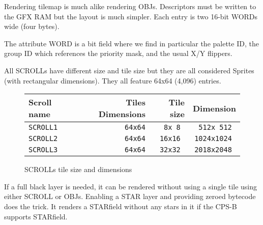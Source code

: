 Rendering tilemap is much alike rendering OBJs. Descriptors must be written to the GFX RAM but the layout is much simpler. Each entry is two 16-bit WORDs wide (four bytes).

 

The attribute WORD is a bit field where we find in particular the palette ID, the group ID which references the priority mask, and the usual X/Y flippers.

 

All SCROLLs have different size and tile size but they are all considered Sprites (with rectangular dimensions). They all feature 64x64 (4,096) entries. 

 \begin{figure}[H]
\begin{tabularx}{\textwidth}{Xrrr}
  \toprule    
  \textbf{Scroll name } & \textbf{ Tiles Dimensions } & \textbf{ Tile size }  & \textbf{Dimension }\\  
  \toprule   
    
\texttt{SCROLL1} & \texttt{64x64} & \texttt{8x 8 } &  \texttt{512x 512 }  \\  
\texttt{SCROLL2} & \texttt{64x64} & \texttt{16x16 } &  \texttt{1024x1024 }   \\  
\texttt{SCROLL3} & \texttt{64x64} & \texttt{32x32 } &  \texttt{2018x2048 }   \\  
  \toprule   
\end{tabularx}
\vspace*{-1mm} %
\caption*{SCROLLs tile size and dimensions}
\end{figure}

If a full black layer is needed, it can be rendered without using a single tile using either SCROLL or OBJs. Enabling a STAR layer and providing zeroed bytecode does the trick. It renders a STARfield without any stars in it if the CPS-B supports STARfield.
























